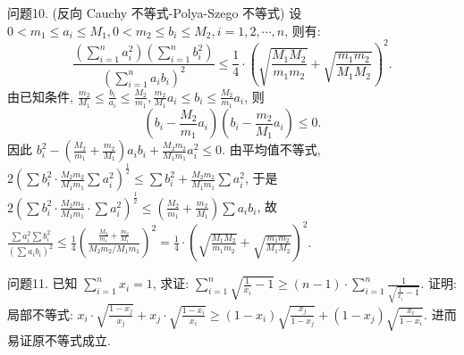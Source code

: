 问题10. (反向 Cauchy 不等式-Polya-Szego 不等式)
设 $0<m_1 \leqslant a_i \leqslant M_1, 0<m_2 \leqslant b_i \leqslant M_2, i=1,2, \cdots, n$, 则有:
$$
\frac{\left(\sum_{i=1}^n a_i^2\right)\left(\sum_{i=1}^n b_i^2\right)}{\left(\sum_{i=1}^n a_i b_i\right)^2} \leqslant \frac{1}{4} \cdot\left(\sqrt{\frac{M_1 M_2}{m_1 m_2}}+\sqrt{\frac{m_1 m_2}{M_1 M_2}}\right)^2 .
$$
由已知条件, $\frac{m_2}{M_1} \leqslant \frac{b_i}{a_i} \leqslant \frac{M_2}{m_1}, \frac{m_2}{M_1} a_i \leqslant b_i \leqslant \frac{M_2}{m_1} a_i$, 则
$$
\left(b_i-\frac{M_2}{m_1} a_i\right)\left(b_i-\frac{m_2}{M_1} a_i\right) \leqslant 0 .
$$
因此 $b_i^2-\left(\frac{M_2}{m_1}+\frac{m_2}{M_1}\right) a_i b_i+\frac{M_2 m_2}{M_1 m_1} a_i^2 \leqslant 0$.
由平均值不等式, $2\left(\sum b_i^2 \cdot \frac{M_2 m_2}{M_1 m_1} \sum a_i^2\right)^{\frac{1}{2}} \leqslant \sum b_i^2+\frac{M_2 m_2}{M_1 m_1} \sum a_i^2$, 于是 $2\left(\sum b_i^2 \cdot \frac{M_2 m_2}{M_1 m_1} \cdot \sum a_i^2\right)^{\frac{1}{2}} \leqslant\left(\frac{M_2}{m_1}+\frac{m_2}{M_1}\right) \sum a_i b_i$, 故 $\frac{\sum a_i^2 \sum b_i^2}{\left(\sum a_i b_i\right)^2} \leqslant \frac{1}{4}\left(\frac{\frac{M_2}{m_1}+\frac{m_2}{M_1}}{M_2 m_2 / M_1 m_1}\right)^2=\frac{1}{4} \cdot\left(\sqrt{\frac{M_1 M_2}{m_1 m_2}}+\sqrt{\frac{m_1 m_2}{M_1 M_2}}\right)^2$.



问题11. 已知 $\sum_{i=1}^n x_i=1$, 求证: $\sum_{i=1}^n \sqrt{\frac{1}{x_i}-1} \geqslant(n-1) \cdot \sum_{i=1}^n \frac{1}{\sqrt{\frac{1}{x_i}-1}}$.
证明:局部不等式: $x_i \cdot \sqrt{\frac{1-x_j}{x_j}}+x_j \cdot \sqrt{\frac{1-x_i}{x_i}} \geqslant\left(1-x_i\right) \sqrt{\frac{x_j}{1-x_j}}+ \left(1-x_j\right) \sqrt{\frac{x_i}{1-x_i}}$. 进而易证原不等式成立.



